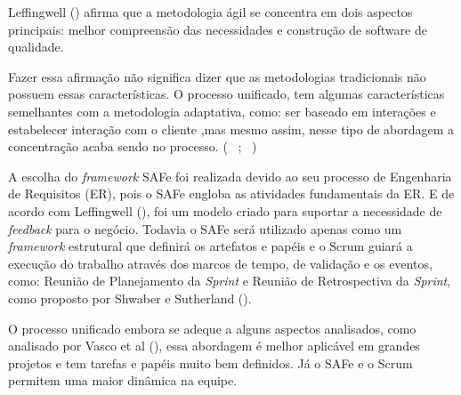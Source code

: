 Leffingwell (\citeyear{safe}) afirma que a metodologia ágil se concentra em dois aspectos principais: 
melhor compreensão das necessidades e construção de software de qualidade. 

Fazer essa afirmação não significa dizer que as metodologias tradicionais não possuem essas características. O processo unificado, 
tem algumas características semelhantes com a metodologia adaptativa, como: ser baseado em interações e estabelecer interação com o cliente
,mas mesmo assim, nesse tipo de abordagem a concentração acaba sendo no processo. (~\cite{safe} ; ~\cite{vasco})

A escolha do \textit{framework} SAFe foi realizada devido ao seu processo de Engenharia de Requisitos (ER), pois o SAFe engloba as atividades
fundamentais da ER. E de acordo com Leffingwell (\citeyear{safe}), foi um modelo criado para suportar a necessidade de \textit{feedback}
para o negócio. Todavia o SAFe será utilizado apenas como um \textit{framework} estrutural que definirá os artefatos e papéis e o Scrum guiará
a execução do trabalho através dos marcos de tempo, de validação e os eventos, como: Reunião de Planejamento da \textit{Sprint} e 
Reunião de Retrospectiva da \textit{Sprint}, como proposto por Shwaber e Sutherland (\citeyear{scrum}).

O processo unificado embora se adeque a alguns aspectos analisados, como analisado por Vasco et al (\citeyear{vasco}),
essa abordagem é melhor  aplicável em grandes projetos e tem tarefas e papéis muito bem definidos.
Já o SAFe e o Scrum permitem uma maior dinâmica na equipe.



